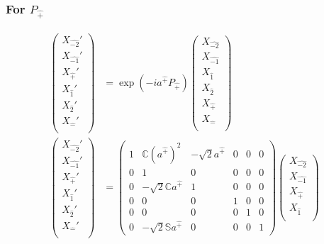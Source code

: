 \documentclass[]{article}
\numberwithin{equation}{section}
\begin{document}
{{\subsubsection{For $P_{\hat{+}}$}
\begin{align}
\begin{pmatrix}
    {X}_{\hat{-2}}'\\
    {X}_{\hat{-1}}'\\
    {X}_{\hat{+}}'\\
    {X}_{\hat{1}}'\\
    {X}_{\hat{2}}'\\
    {X}_{\hat{-}}'\\
    \end{pmatrix}&= \exp{(-ia^{\hat{+}}P_{\hat{+}})}\begin{pmatrix}
    {X}_{\hat{-2}}\\
    {X}_{\hat{-1}}\\
    {X}_{\hat{1}}\\
    {X}_{\hat{2}}\\
    {X}_{\hat{+}}\\
    {X}_{\hat{-}}\\
    \end{pmatrix}\\
    \begin{pmatrix}
    {X}_{\hat{-2}}'\\
    {X}_{\hat{-1}}'\\
    {X}_{\hat{+}}'\\
    {X}_{\hat{1}}'\\
    {X}_{\hat{2}}'\\
    {X}_{\hat{-}}'\\
    \end{pmatrix}&= \begin{pmatrix}
        1&\mathbb{C}(a^{\hat{+}})^2&-\sqrt{2}a^{\hat{+}}&0&0&0\\
        0&1&0&0&0&0\\
        0&-\sqrt{2}\mathbb{C}a^{\hat{+}}&1&0&0&0\\
        0&0&0&1&0&0\\
        0&0&0&0&1&0\\
        0&-\sqrt{2}\mathbb{S}a^{\hat{+}}&0&0&0&1
    \end{pmatrix}\begin{pmatrix}
    {X}_{\hat{-2}}\\
    {X}_{\hat{-1}}\\
    {X}_{\hat{+}}\\
    {X}_{\hat{1}}\\

\end{pmatrix}
\end{align}}}
\end{document}
